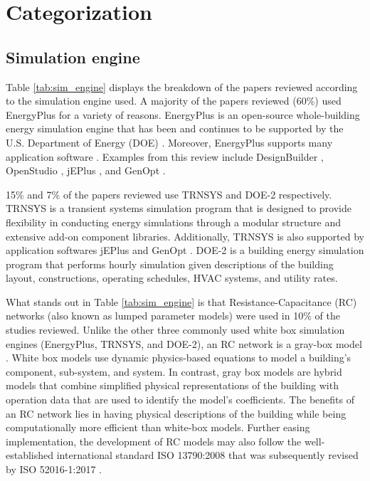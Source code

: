 \documentclass[review]{elsarticle}
\begin{document}
\section{Categorization}

\subsection{Simulation engine}

Table \ref{tab:sim_engine} displays the breakdown of the papers reviewed according to the simulation engine used. A majority of the papers reviewed (60\%) used EnergyPlus for a variety of reasons. EnergyPlus is an open-source whole-building energy simulation engine that has been and continues to be supported by the U.S. Department of Energy (DOE) \cite{doe_energyplus}. Moreover, EnergyPlus supports many application software \cite{ibpsa_best}. Examples from this review include DesignBuilder \cite{designbuilder}, OpenStudio \cite{guglielmetti2011openstudio}, jEPlus \cite{jeplus}, and GenOpt \cite{wetter2001genopt}. 

15\% and 7\% of the papers reviewed use TRNSYS and DOE-2 respectively. TRNSYS \cite{klein2017trnsys} is a transient systems simulation program that is designed to provide flexibility in conducting energy simulations through a modular structure and extensive add-on component libraries. Additionally, TRNSYS is also supported by application softwares jEPlus \cite{jeplus} and GenOpt \cite{wetter2001genopt}. DOE-2 \cite{doe2} is a building energy simulation program that performs hourly simulation given descriptions of the building layout, constructions, operating schedules, HVAC systems, and utility rates. 

What stands out in Table \ref{tab:sim_engine} is that Resistance-Capacitance (RC) networks (also known as lumped parameter models) were used in 10\% of the studies reviewed. Unlike the other three commonly used white box simulation engines (EnergyPlus, TRNSYS, and DOE-2), an RC network is a gray-box model \cite{li2014review}. White box models use dynamic physics-based equations to model a building's component, sub-system, and system. In contrast, gray box models are hybrid models that combine simplified physical representations of the building with operation data that are used to identify the model's coefficients. The benefits of an RC network lies in having physical descriptions of the building while being computationally more efficient than white-box models. Further easing implementation, the development of RC models may also follow the well-established international standard ISO 13790:2008 \cite{iso13790energy} that was subsequently revised by ISO 52016-1:2017 \cite{iso52016energy}.
\end{document}
